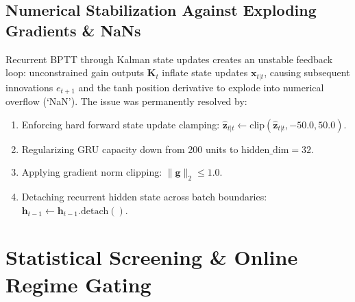 \documentclass[11pt, a4paper]{article}
\begin{document}
\subsection{Numerical Stabilization Against Exploding Gradients \& NaNs}
Recurrent BPTT through Kalman state updates creates an unstable feedback loop: unconstrained gain outputs $\mathbf{K}_t$ inflate state updates $\mathbf{x}_{t|t}$, causing subsequent innovations $e_{t+1}$ and the tanh position derivative to explode into numerical overflow (`NaN'). The issue was permanently resolved by:
\begin{enumerate}
    \item Enforcing hard forward state update clamping: $\hat{\mathbf{z}}_{t|t} \leftarrow \text{clip}(\hat{\mathbf{z}}_{t|t}, -50.0, 50.0)$.
    \item Regularizing GRU capacity down from 200 units to $\text{hidden\_dim} = 32$.
    \item Applying gradient norm clipping: $\|\mathbf{g}\|_2 \le 1.0$.
    \item Detaching recurrent hidden state across batch boundaries: $\mathbf{h}_{t-1} \leftarrow \mathbf{h}_{t-1}.\text{detach}()$.
\end{enumerate}

\section{Statistical Screening \& Online Regime Gating}
\end{document}
